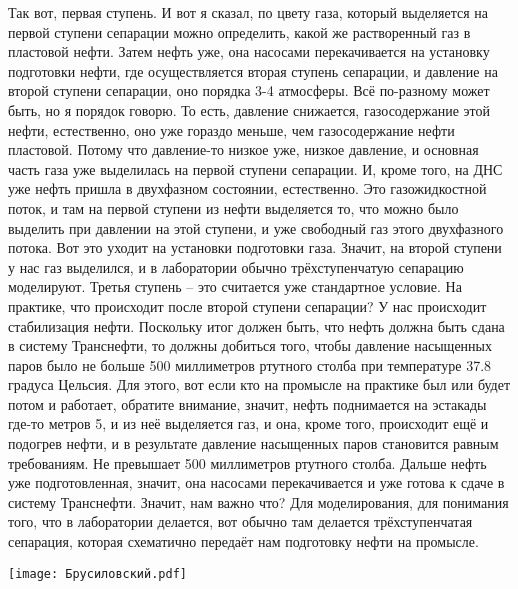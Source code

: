 \documentclass[main.tex]{subfiles}
\begin{document}
Так вот, первая ступень.
И вот я сказал, по цвету газа, который выделяется на первой ступени сепарации можно определить, какой же растворенный газ в пластовой нефти.
Затем нефть уже, она насосами перекачивается на установку подготовки нефти, где осуществляется вторая ступень сепарации, и давление на второй ступени сепарации, оно порядка 3-4 атмосферы.
Всё по-разному может быть, но я порядок говорю.
То есть, давление снижается, газосодержание этой нефти, естественно, оно уже гораздо меньше, чем газосодержание нефти пластовой.
Потому что давление-то низкое уже, низкое давление, и основная часть газа уже выделилась на первой ступени сепарации.
И, кроме того, на ДНС уже нефть пришла в двухфазном состоянии, естественно.
Это газожидкостной поток, и там на первой ступени из нефти выделяется то, что можно было выделить при давлении на этой ступени, и уже свободный газ этого двухфазного потока.
Вот это уходит на установки подготовки газа.
Значит, на второй ступени у нас газ выделился, и в лаборатории обычно трёхступенчатую сепарацию моделируют.
Третья ступень -- это считается уже стандартное условие.
На практике, что происходит после второй ступени сепарации?
У нас происходит стабилизация нефти.
Поскольку итог должен быть, что нефть должна быть сдана в систему Транснефти, то должны добиться того, чтобы давление насыщенных паров было не больше 500 миллиметров ртутного столба при температуре 37.8 градуса Цельсия.
Для этого, вот если кто на промысле на практике был или будет потом и работает, обратите внимание, значит, нефть поднимается на эстакады где-то метров 5, и из неё выделяется газ, и она, кроме того, происходит ещё и подогрев нефти, и в результате давление насыщенных паров становится равным требованиям.
Не превышает 500 миллиметров ртутного столба.
Дальше нефть уже подготовленная, значит, она насосами перекачивается и уже готова к сдаче в систему Транснефти.
Значит, нам важно что?
Для моделирования, для понимания того, что в лаборатории делается, вот обычно там делается трёхступенчатая сепарация, которая схематично передаёт нам подготовку нефти на промысле.

\begin{center}
\texttt{[image: Брусиловский.pdf]}
\end{center}
\end{document}
